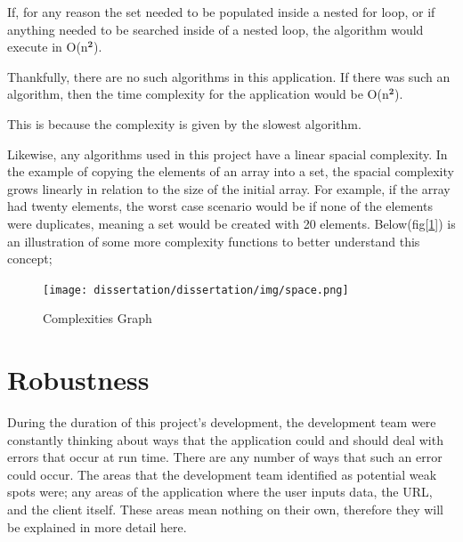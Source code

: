 \bigskip

If, for any reason the set needed to be populated inside a nested for loop, or if anything needed to be searched inside of a nested loop, the algorithm would execute in O(n\begin{math}\mathbf{^2}\end{math}). 

Thankfully, there are no such algorithms in this application. If there was such an algorithm, then the time complexity for the application would be O(n\begin{math}\mathbf{^2}\end{math}).

This is because the complexity is given by the slowest algorithm. 

\bigskip

Likewise, any algorithms used in this project have a linear spacial complexity. In the example of copying the elements of an array into a set, the spacial complexity grows linearly in relation to the size of the initial array. For example, if the array had twenty elements, the worst case scenario would be if none of the elements were duplicates, meaning a set would be created with 20 elements. 
Below(fig[\ref{fig:bigO}]) is an illustration of some more complexity functions to better understand this concept;

\begin{figure}[H]
    \centering
    \texttt{[image: dissertation/dissertation/img/space.png]}
    \caption{Complexities Graph}
    \label{fig:bigO}
\end{figure}

\bigskip



\section{Robustness}
\label{sec:SystemEvaluationRobustness}

During the duration of this project's development, the development team were constantly thinking about ways that the application could and should deal with errors that occur at run time. There are any number of ways that such an error could occur. The areas that the development team identified as potential weak spots were; any areas of the application where the user inputs data, the URL, and the client itself. These areas mean nothing on their own, therefore they will be explained in more detail here.

